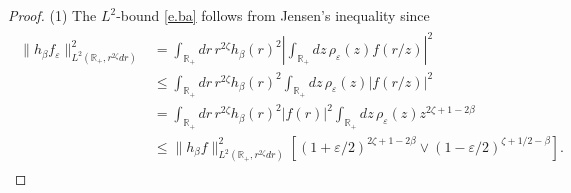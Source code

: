 \documentclass[12pt,reqno]{amsart}
\theoremstyle{definition}
\theoremstyle{remark}
\numberwithin{equation}{section}
\newcommand{\1}{\mathbbm{1}}
\renewcommand{\epsilon}{\varepsilon}
\newcommand{\R}{\mathbb{R}}
\begin{document}
\begin{proof}
  (1) The $L^2$-bound \eqref{e.ba} follows from Jensen's inequality since
  \begin{align}
    \begin{split}
      \|h_\beta f_\epsilon\|_{L^2(\R_+,r^{2\zeta}dr)}^2
      & = \int_{\R_+}dr\, r^{2\zeta} h_\beta(r)^2 \left|\int_{\R_+}dz\, \rho_\epsilon(z) f(r/z)\right|^2 \\
      & \leq \int_{\R_+}dr\, r^{2\zeta} h_\beta(r)^2 \int_{\R_+}dz\, \rho_\epsilon(z)|f(r/z)|^2 \\
      & = \int_{\R_+}dr\, r^{2\zeta} h_\beta(r)^2 |f(r)|^2 \int_{\R_+}dz\, \rho_\epsilon(z)z^{2\zeta+1-2\beta} \\
      & \leq \|h_\beta f\|_{L^2(\R_+,r^{2\zeta}dr)}^2 \left[(1+\epsilon/2)^{2\zeta+1-2\beta}\vee (1-\epsilon/2)^{\zeta+1/2-\beta}\right].
    \end{split}
  \end{align}
  

\end{proof}
\end{document}
